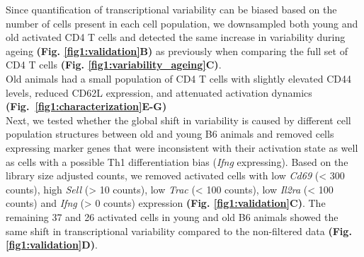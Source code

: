 Since quantification of transcriptional variability can be biased based on the number of cells present in each cell population, we downsampled both young and old activated CD4\plus{} T cells and detected the same increase in variability during ageing \textbf{(Fig. \ref{fig1:validation}B)} as previously when comparing the full set of CD4\plus{} T cells \textbf{(Fig. \ref{fig1:variability_ageing}C)}. \\

Old animals had a small population of CD4\plus{} T cells with slightly elevated CD44 levels, reduced CD62L expression, and attenuated activation dynamics \textbf{(Fig.~\ref{fig1:characterization}E-G)}\\

Next, we tested whether the global shift in variability is caused by different cell population structures between old and young B6 animals and removed cells expressing marker genes that were inconsistent with their activation state as well as cells with a possible Th1 differentiation bias (\textit{Ifng} expressing). Based on the library size adjusted counts, we removed activated cells with low \textit{Cd69} (< 300 counts), high \textit{Sell} (> 10 counts), low \textit{Trac} (< 100 counts), low \textit{Il2ra} (< 100 counts) and \textit{Ifng} (> 0 counts) expression \textbf{(Fig. \ref{fig1:validation}C)}. The remaining 37 and 26 activated cells in young and old B6 animals showed the same shift in transcriptional variability compared to the non-filtered data \textbf{(Fig. \ref{fig1:validation}D)}. \\

